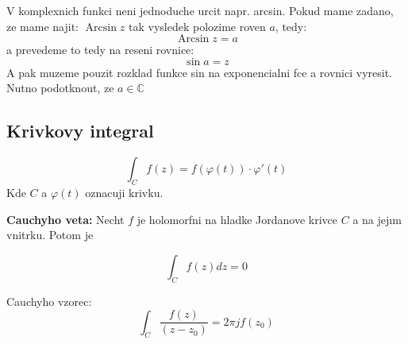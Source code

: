 V komplexnich funkci neni jednoduche urcit napr. arcsin. Pokud mame zadano, ze mame najit:
$\operatorname{Arcsin} z$ tak vysledek polozime roven $a$, tedy:
$$\operatorname{Arcsin} z =a $$
a prevedeme to tedy na reseni rovnice:
$$\operatorname{sin} a = z$$
A pak muzeme pouzit rozklad funkce sin na exponencialni fce a rovnici vyresit. Nutno podotknout, ze $a \in \mathbb{C}$

\subsection*{Krivkovy integral}

$$\int_C f(z) = f(\varphi(t))\cdot \varphi ' (t)$$
Kde $C$ a $\varphi(t)$ oznacuji krivku.

\textbf{Cauchyho veta:}
Necht $f$ je holomorfni na hladke Jordanove krivce $C$ a na jejım vnitrku. Potom je

$$\int_C f(z) dz = 0$$

Cauchyho vzorec:
\begin{equation}
\label{eq:cauchyho}
\int_C \frac{f(z)}{(z-z_0)} = 2\pi j f(z_0)
\end{equation}
